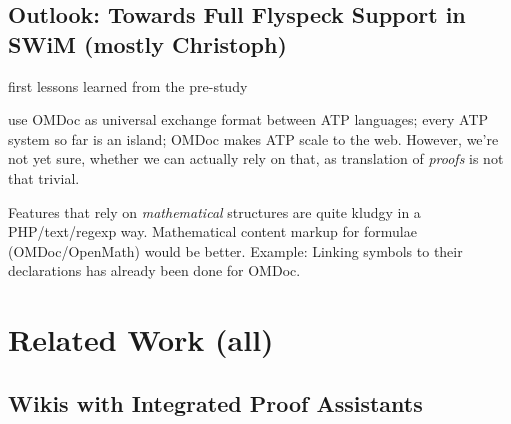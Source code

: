 \documentclass{llncs}
\begin{document}
\subsection{Outlook: Towards Full Flyspeck Support in SWiM (mostly Christoph)}
\label{sec:flyspeck-swim}

first lessons learned from the pre-study

use OMDoc as universal exchange format between ATP languages; every ATP system so far is
an island; OMDoc makes ATP scale to the web.  However, we're not yet sure, whether we can actually rely on that, as translation of \emph{proofs} is not
that trivial.

Features that rely on \emph{mathematical} structures are quite kludgy in a PHP/text/regexp
way.  Mathematical content markup for formulae (OMDoc/OpenMath) would be better.  Example:
Linking symbols to their declarations has already been done for OMDoc.



\section{Related Work (all)}
\label{sec:related}


\subsection{Wikis with Integrated Proof Assistants}
\label{sec:wiki-pa}
\end{document}
